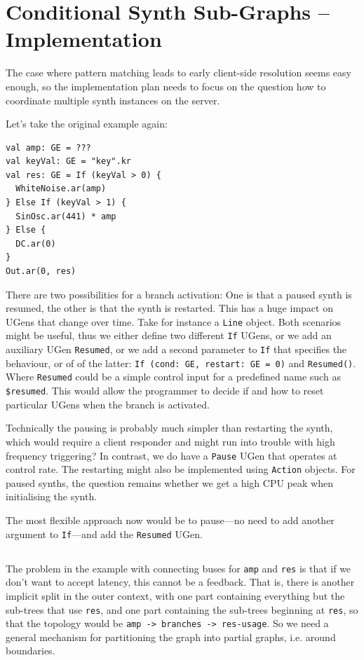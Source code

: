 \documentclass[11pt,a4paper]{article}
\begin{document}
\section{Conditional Synth Sub-Graphs -- Implementation}

The case where pattern matching leads to early client-side resolution seems easy enough, so the implementation plan needs to focus on the question how to coordinate multiple synth instances on the server.

Let's take the original example again:
%
\begin{verbatim}
val amp: GE = ???
val keyVal: GE = "key".kr
val res: GE = If (keyVal > 0) {
  WhiteNoise.ar(amp)
} Else If (keyVal > 1) {
  SinOsc.ar(441) * amp
} Else {
  DC.ar(0)
}
Out.ar(0, res)
\end{verbatim}
%
There are two possibilities for a branch activation: One is that a paused synth is resumed, the other is that the synth is restarted. This has a huge impact on UGens that change over time. Take for instance a \verb!Line! object. Both scenarios might be useful, thus we either define two different \verb!If! UGens, or we add an auxiliary UGen \verb!Resumed!, or we add a second parameter to \verb!If! that specifies the behaviour, or of of the latter: \verb!If (cond: GE, restart: GE = 0)! and \verb!Resumed()!. Where \verb!Resumed! could be a simple control input for a predefined name such as \verb!$resumed!. This would allow the programmer to decide if and how to reset particular UGens when the branch is activated.

Technically the pausing is probably much simpler than restarting the synth, which would require a client responder and might run into trouble with high frequency triggering? In contrast, we do have a \verb!Pause! UGen that operates at control rate. The restarting might also be implemented using \verb!Action! objects. For paused synths, the question remains whether we get a high CPU peak when initialising the synth.

The most flexible approach now would be to pause---no need to add another argument to \verb!If!---and add the \verb!Resumed! UGen.

\subsection*{\centering *}

The problem in the example with connecting buses for \verb!amp! and \verb!res! is that if we don't want to accept latency, this cannot be a feedback. That is, there is another implicit split in the outer context, with one part containing everything but the sub-trees that use \verb!res!, and one part containing the sub-trees beginning at \verb!res!, so that the topology would be \verb!amp -> branches -> res-usage!. So we need a general mechanism for partitioning the graph into partial graphs, i.e. around boundaries.
\end{document}
